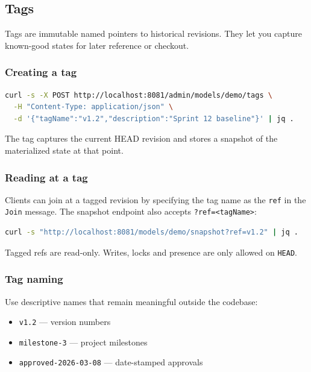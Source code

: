 \subsection{Tags}

Tags are immutable named pointers to historical revisions. They let you
capture known-good states for later reference or checkout.

\subsubsection{Creating a tag}

\begin{lstlisting}[language=bash,caption={Create a tag}]
curl -s -X POST http://localhost:8081/admin/models/demo/tags \
  -H "Content-Type: application/json" \
  -d '{"tagName":"v1.2","description":"Sprint 12 baseline"}' | jq .
\end{lstlisting}

The tag captures the current HEAD revision and stores a snapshot of the
materialized state at that point.

\subsubsection{Reading at a tag}

Clients can join at a tagged revision by specifying the tag name as the
\texttt{ref} in the \texttt{Join} message. The snapshot endpoint also accepts
\texttt{?ref=<tagName>}:

\begin{lstlisting}[language=bash,caption={Read snapshot at tag}]
curl -s "http://localhost:8081/models/demo/snapshot?ref=v1.2" | jq .
\end{lstlisting}

Tagged refs are read-only. Writes, locks and presence are only allowed on
\texttt{HEAD}.

\subsubsection{Tag naming}

Use descriptive names that remain meaningful outside the codebase:

\begin{itemize}
\item \texttt{v1.2} --- version numbers
\item \texttt{milestone-3} --- project milestones
\item \texttt{approved-2026-03-08} --- date-stamped approvals
\end{itemize}

